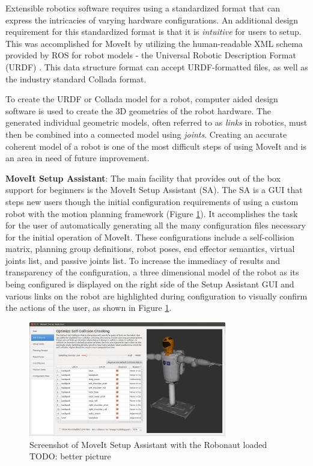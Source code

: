 \documentclass[10pt,journal,compsoc]{joser1}
\begin{document}
{Extensible robotics software requires using a standardized format that can express the intricacies of varying hardware configurations. An additional design requirement for this standardized format is that it is \textit{intuitive} for users to setup. This was accomplished for MoveIt by utilizing the human-readable XML schema provided by ROS for robot models - the Universal Robotic Description Format (URDF) \cite{urdf}. This data structure format can accept URDF-formatted files, as well as the industry standard Collada \cite{collada} format.

To create the URDF or Collada model for a robot, computer aided design software is used to create the 3D geometries of the robot hardware. The generated individual geometric models, often referred to as \textit{links} in robotics, must then be combined into a connected model using \textit{joints}. Creating an accurate coherent model of a robot is one of the most difficult steps of using MoveIt and is an area in need of future improvement.

{\bf MoveIt Setup Assistant}: The main facility that provides out of the box support for beginners is the MoveIt Setup Assistant (SA). The SA is a GUI that steps new users though the initial configuration requirements of using a custom robot with the motion planning framework (Figure \ref{fig:setupassistant}). It accomplishes the task for the user of automatically generating all the many configuration files necessary for the initial operation of MoveIt. These configurations include a self-collision matrix, planning group definitions, robot poses, end effector semantics, virtual joints list, and passive joints list. To increase the immediacy of results and transparency of the configuration, a three dimensional model of the robot as its being configured is displayed on the right side of the Setup Assistant GUI and various links on the robot are highlighted during configuration to visually confirm the actions of the user, as shown in Figure \ref{fig:setupassistant}.

\begin{figure}[!t]
\centering
\includegraphics[width=3.4in]{images/setup_assistant}
\caption{Screenshot of MoveIt Setup Assistant with the Robonaut loaded TODO: better picture}
\label{fig:setupassistant}
\end{figure}

}
\end{document}
